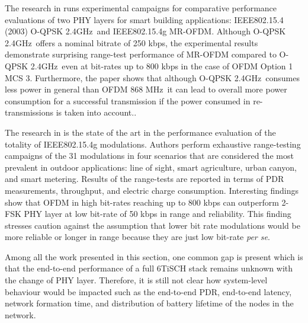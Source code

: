 \documentclass[journal]{IEEEtran}
\newcommand{\oqpsk}        {O-QPSK 2.4GHz}
\newcommand{\ofdm}         {OFDM 868 MHz}
\begin{document}
The research in \cite{munoz18overview} runs experimental campaigns for comparative performance evaluations of two PHY layers for smart building applications: IEEE802.15.4 (2003) \oqpsk\ and IEEE802.15.4g MR-OFDM. 
Although \oqpsk\ offers a nominal bitrate of 250 kbps, the experimental results demonstrate surprising range-test performance of MR-OFDM compared to \oqpsk\ even at bit-rates up to 800 kbps in the case of OFDM Option 1 MCS 3. 
Furthermore, the paper shows that although \oqpsk\ consumes less power in general than \ofdm\, it can lead to overall more power consumption for a successful transmission if the power consumed in re-transmissions is taken into account..  

The research in \cite{munoz18evaluationa} is the state of the art in the performance evaluation of the totality of IEEE802.15.4g modulations.
Authors perform exhaustive  range-testing campaigns of the 31 modulations in four scenarios that are considered the most prevalent in outdoor applications: line of sight, smart agriculture, urban canyon, and smart metering. 
Results of the range-tests are reported in terms of PDR measurements, throughput, and electric charge consumption.
Interesting findings show that OFDM in high bit-rates reaching up to 800 kbps can outperform 2-FSK PHY layer at low bit-rate of 50 kbps in range and reliability. 
This finding stresses caution against the assumption that lower bit rate modulations would be more reliable or longer in range because they are just low bit-rate \textit{per se}. 

Among all the work presented in this section, one common gap is present which is that the end-to-end performance of a full 6TiSCH stack remains unknown with the change of PHY layer. 
Therefore, it is still not clear how system-level behaviour would be impacted such as the end-to-end  PDR, end-to-end latency, network formation time, and distribution of battery lifetime of the nodes in the network.  

\end{document}

